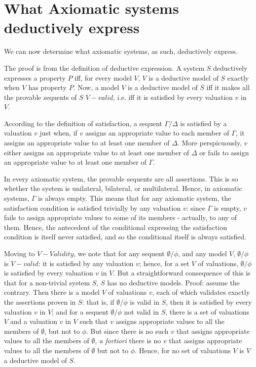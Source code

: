 \documentclass[]{article}
\begin{document}
\section{What Axiomatic systems deductively express}
We can now determine what axiomatic systems, as such, deductively express.

The proof is from the definition of deductive expression. A system $S$ deductively expresses a property $P$ iff, for every model $V$, $V$ is a deductive model of $S$ exactly when $V$ has property $P$. Now, a model $V$ is a deductive model of $S$ iff it makes all the provable sequents of $S$ $V-valid$, i.e. iff it is satisfied by every valuation $v$ in $V$.

According to the definition of satisfaction, a sequent $\Gamma / \Delta$ is satisfied by a valuation $v$ just when, if $v$ assigns an appropriate value to each member of $\Gamma$, it assigns an appropriate value to at least one member of $\Delta$. More perspicuously, $v$ either assigns an appropriate value to at least one member of $\Delta$ or fails to assign an appropriate value to at least one member of $\Gamma$. 

In every axiomatic system, the provable sequents are all assertions. This is so whether the system is unilateral, bilateral, or multilateral. Hence, in axiomatic systems, $\Gamma$ is always empty. This means that for any axiomatic system, the satisfaction condition is satisfied trivially by any valuation $v$: since $\Gamma$ is empty, $v$ fails to assign appropriate values to some of its members - actually, to any of them. Hence, the antecedent of the conditional expressing the satisfaction condition is itself never satisfied, and so the conditional itself is always satisfied.

Moving to $V-Validity$, we note that for any sequent $ \emptyset / \phi $, and any model $V$, $ \emptyset / \phi $ is $V-valid$: it is satisfied by any valuation $v$; hence, for a set $V$ of valuations, $\emptyset / \phi $ is satisfied by every valuation $v$ in $V$.  But a straightforward consequence of this is that for a non-trivial system $S$, $S$ has no deductive models. Proof: assume the contrary. Then there is a model $V$ of valuations $v$, each of which validates exactly the assertions proven in $S$: that is, if $\emptyset / \phi$ is valid in $S$, then it is satisfied by every valuation $v$ in $V$; and for a sequent $\emptyset / \phi$ not valid in $S$, there is a set of valuations $V$ and a valuation $v$ in $V$ such that $v$ assigns appropriate values to all the members of $\emptyset$, but not to $\phi$. But since there is no such $v$ that assigns appropriate values to all the members of $\emptyset$, \textit{a fortiori} there is no $v$ that assigns appropriate values to all the members of $\emptyset$ but not to $\phi$. Hence, for no set of valuations $V$ is $V$ a deductive model of $S$.
\end{document}
